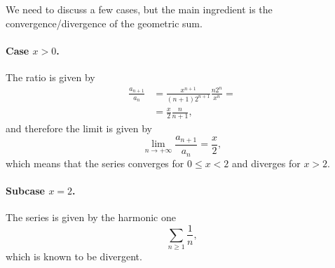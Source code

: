 \documentclass[a4paper,10 pt]{report}
\theoremstyle{definition}
\begin{document}
\begin{solutionBox} We need to discuss a few cases, but the main ingredient is the convergence/divergence of the geometric sum.

\paragraph{Case $x > 0$.} The ratio is given by
\begin{equation*}\begin{aligned} \frac{a_{n + 1}}{a_n} & = \frac{x^{n+1}}{(n+1)2^{n+1}} \frac{n 2^n}{x^n} =
\\[1em] & = \frac{x}{2} \frac{n}{n+1},
\end{aligned} \end{equation*}
and therefore the limit is given by
\begin{equation*}\lim_{n \to + \infty} \frac{a_{n+1}}{a_n} = \frac{x}{2}, \end{equation*}
which means that the series converges for $0 \leq x < 2$ and diverges for $x > 2$.

\paragraph{Subcase $x = 2$.} The series is given by the harmonic one
\begin{equation*} \sum_{n \geq 1} \frac{1}{n} , \end{equation*}
which is known to be divergent.


\end{solutionBox}
\end{document}
